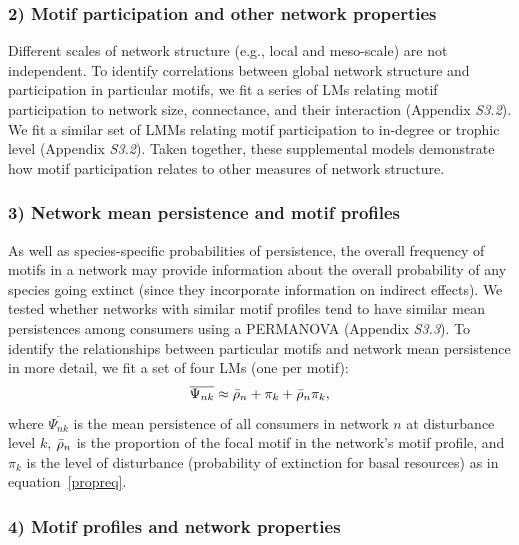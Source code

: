 \documentclass[12pt]{article}
\begin{document}
\begin{spacing}{2.0}
    \subsubsection*{2) Motif participation and other network properties}    
        Different scales of network structure (e.g., local and meso-scale) are not independent. 
        To identify correlations between global network structure and participation in particular motifs, we fit a series of LMs relating motif participation to network size, connectance, and their interaction (Appendix \emph{S3.2}).
        We fit a similar set of  LMMs relating motif participation to in-degree or trophic level (Appendix \emph{S3.2}).
        Taken together, these supplemental models demonstrate how motif participation relates to other measures of network structure.
        
        
    \subsubsection*{3) Network mean persistence and motif profiles}

        As well as species-specific probabilities of persistence, the overall frequency of motifs in a network may provide information about the overall probability of any species going extinct (since they incorporate information on indirect effects).
        We tested whether networks with similar motif profiles tend to have similar mean persistences among consumers using a PERMANOVA (Appendix \emph{S3.3}).
        To identify the relationships between particular motifs and network mean persistence in more detail, we fit a set of four LMs (one per motif):
            \begin{equation}
                \overline{\Psi_{nk}} \approx \Bar{\rho}_{n} + \pi_{k} + \Bar{\rho}_{n}\pi_{k},
                \label{netpropeq}
            \end{equation}
        \noindent where $\overline{\Psi_{nk}}$ is the mean persistence of all consumers in network $n$ at disturbance level $k$, $\Bar{\rho}_{n}$ is the proportion of the focal motif in the network's motif profile, and $\pi_k$ is the level of disturbance (probability of extinction for basal resources) as in equation~\ref{propreq}.
            
    \subsubsection*{4) Motif profiles and network properties}
    

\end{spacing}
\end{document}
